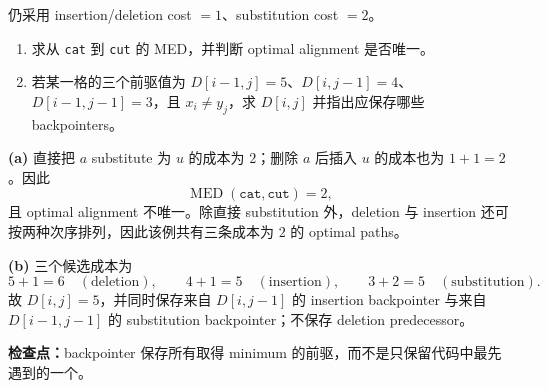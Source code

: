 仍采用 insertion/deletion cost $=1$、substitution cost $=2$。

\begin{enumerate}[label=(\alph*)]
  \item 求从 \texttt{cat} 到 \texttt{cut} 的 MED，并判断 optimal alignment 是否唯一。
  \item 若某一格的三个前驱值为 $D[i-1,j]=5$、$D[i,j-1]=4$、$D[i-1,j-1]=3$，且 $x_i\ne y_j$，求 $D[i,j]$ 并指出应保存哪些 backpointers。
\end{enumerate}

\begin{workedsolution}
\textbf{(a)} 直接把 $a$ substitute 为 $u$ 的成本为 $2$；删除 $a$ 后插入 $u$ 的成本也为 $1+1=2$。因此
\[
  \operatorname{MED}(\texttt{cat},\texttt{cut})=2,
\]
且 optimal alignment 不唯一。除直接 substitution 外，deletion 与 insertion 还可按两种次序排列，因此该例共有三条成本为 $2$ 的 optimal paths。

\textbf{(b)} 三个候选成本为
\[
  5+1=6\quad(\text{deletion}),\qquad
  4+1=5\quad(\text{insertion}),\qquad
  3+2=5\quad(\text{substitution}).
\]
故 $D[i,j]=5$，并同时保存来自 $D[i,j-1]$ 的 insertion backpointer 与来自 $D[i-1,j-1]$ 的 substitution backpointer；不保存 deletion predecessor。
\end{workedsolution}

\textbf{检查点：}backpointer 保存所有取得 minimum 的前驱，而不是只保留代码中最先遇到的一个。
